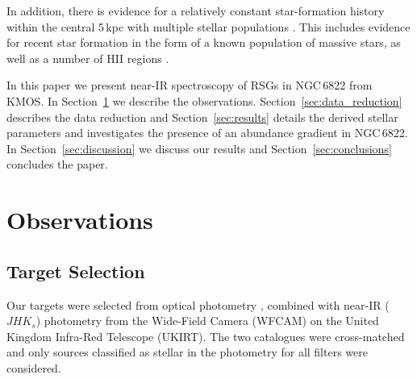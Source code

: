 \documentclass[iop]{emulateapj}
\begin{document}
In addition, there is evidence for a relatively constant star-formation history within the central 5\,kpc
\citep{2014ApJ...789..147W}
with multiple stellar populations
\citep{2006A&A...451...99B,2012A&A...540A.135S}.
This includes evidence for recent star formation in the form of a known population of massive stars, as well as a number of HII regions
\citep{2001ApJ...547..765V,2006AJ....131..343D,2009A&A...505.1027H,2012AJ....144....2L}.

In this paper we present near-IR spectroscopy of RSGs in NGC\,6822 from KMOS.
In Section~\ref{sec:observations} we describe the observations.
Section~\ref{sec:data_reduction} describes the data reduction and 
Section~\ref{sec:results} details the derived stellar parameters and investigates the presence of an abundance gradient in NGC\,6822.
In Section~\ref{sec:discussion} we discuss our results and
Section~\ref{sec:conclusions} concludes the paper.


\section{Observations}


\label{sec:observations}

\subsection{Target Selection} %
\label{sub:target_selection}

Our targets were selected from optical photometry
\citep{2007AJ....134.2474M}, combined with near-IR ($JHK{_s}$) photometry
\cite[for details see][]{2012A&A...540A.135S} from the Wide-Field Camera (WFCAM) on the United Kingdom Infra-Red Telescope (UKIRT).
The two catalogues were cross-matched and only sources classified as stellar in the photometry for all filters were considered.
\end{document}

